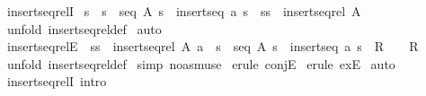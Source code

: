 \begin{isabellebody}
%
\endisatagproof
{\isafoldproof}%
%
\isadelimproof
\isanewline
%
\endisadelimproof
\isanewline
{}\isamarkupfalse%
\ insertseq{\isacharunderscore}relI{\isacharcolon}\ \isanewline
{\isachardoublequoteopen}{\isacharbang}{\isacharbang}s{\isachardot}\ {\isacharbrackleft}{\isacharbar}\ s\ {\isacharcolon}\ seq\ A{\isacharsemicolon}\ s{\isacharprime}\ {\isacharequal}\ insertseq\ a\ s{\isacharbar}{\isacharbrackright}\ {\isacharequal}{\isacharequal}{\isachargreater}\ {\isacharparenleft}s{\isacharcomma}s{\isacharprime}{\isacharparenright}\ {\isacharcolon}\ insertseq{\isacharunderscore}rel\ A{\isachardoublequoteclose}\isanewline
%
\isadelimproof
%
\endisadelimproof
%
\isatagproof
{}\isamarkupfalse%
\ {\isacharparenleft}unfold\ insertseq{\isacharunderscore}rel{\isacharunderscore}def{\isacharparenright}\isanewline
{}\isamarkupfalse%
\ auto\isanewline
{}\isamarkupfalse%
%
\endisatagproof
{\isafoldproof}%
%
\isadelimproof
\isanewline
%
\endisadelimproof
\isanewline
{}\isamarkupfalse%
\ insertseq{\isacharunderscore}relE{\isacharcolon}\ {\isachardoublequoteopen}{\isacharbrackleft}{\isacharbar}\ {\isacharparenleft}s{\isacharcomma}s{\isacharprime}{\isacharparenright}\ {\isacharcolon}\ insertseq{\isacharunderscore}rel\ A{\isacharsemicolon}\ {\isacharbang}{\isacharbang}a{\isachardot}\ {\isacharbrackleft}{\isacharbar}\ s\ {\isacharcolon}\ seq\ A{\isacharsemicolon}\ s{\isacharprime}\ {\isacharequal}\ insertseq\ a\ s{\isacharbar}{\isacharbrackright}\ {\isacharequal}{\isacharequal}{\isachargreater}\ R\ {\isacharbar}{\isacharbrackright}\ \ {\isacharequal}{\isacharequal}{\isachargreater}\ R{\isachardoublequoteclose}\isanewline
%
\isadelimproof
%
\endisadelimproof
%
\isatagproof
{}\isamarkupfalse%
\ {\isacharparenleft}unfold\ insertseq{\isacharunderscore}rel{\isacharunderscore}def{\isacharparenright}\isanewline
{}\isamarkupfalse%
\ {\isacharparenleft}simp\ {\isacharparenleft}no{\isacharunderscore}asm{\isacharunderscore}use{\isacharparenright}{\isacharparenright}\isanewline
{}\isamarkupfalse%
\ {\isacharparenleft}erule\ conjE{\isacharparenright}\isanewline
{}\isamarkupfalse%
\ {\isacharparenleft}erule\ exE{\isacharparenright}\isanewline
{}\isamarkupfalse%
\ auto\isanewline
{}\isamarkupfalse%
%
\endisatagproof
{\isafoldproof}%
%
\isadelimproof
\isanewline
%
\endisadelimproof
\isanewline
{}\isamarkupfalse%
\ insertseq{\isacharunderscore}relI\ {\isacharbrackleft}intro{\isacharbang}{\isacharbrackright}\isanewline

\end{isabellebody}
